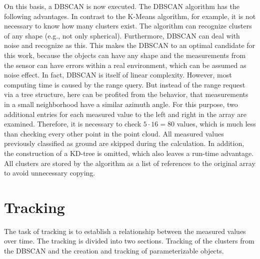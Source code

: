 \documentclass[11pt,oneside,openright]{mpreport}
\begin{document}
On this basis, a \ac{DBSCAN} \cite{DBSCAN} is now executed. The \ac{DBSCAN} algorithm has the following advantages. In contrast to the K-Means algorithm,
for example, it is not necessary to know how many clusters exist. The algorithm can recognize clusters of any shape (e.g., not only spherical).
Furthermore, \ac{DBSCAN} can deal with noise and recognize as this. This makes the \ac{DBSCAN} to an optimal candidate for this work, because the objects can have any shape and the measurements from the sensor can have errors within a real environment, which can be assumed as noise effect. 
In fact, \ac{DBSCAN} is itself of linear complexity. However, most computing time is caused by the range query.
But instead of the range request via a tree structure, here can be profited from the behavior, that measurements in a small neighborhood have a similar azimuth angle.
For this purpose, two additional entries for each measured value to the left and right in the array are examined. 
Therefore, it is necessary to check $5 \cdot 16 = 80$ values, which is much less than checking every other point in the point cloud. %
All measured values previously classified as ground are skipped during the calculation. In addition, the construction of a KD-tree is omitted, 
which also leaves a run-time advantage.
All clusters are stored by the algorithm as a list of references to the original array to avoid unnecessary copying.


\section{Tracking}
\label{tracking}
The task of tracking is to establish a relationship between the measured values over time. The tracking is divided into two sections.
Tracking of the clusters from the \ac{DBSCAN} and the creation and tracking of parameterizable objects.
\end{document}
